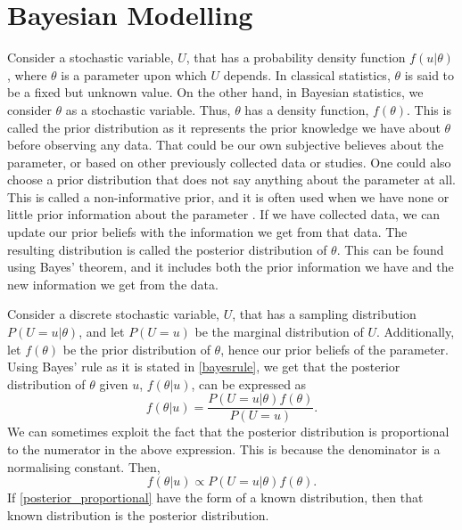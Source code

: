 \section{Bayesian Modelling}
\label{theory_bayesian_modelling}
Consider a stochastic variable, $U$, that has a probability density function $f(u|\theta)$, where $\theta$ is a parameter upon which $U$ depends. In classical statistics, $\theta$ is said to be a fixed but unknown value. On the other hand, in Bayesian statistics, we consider $\theta$ as a stochastic variable. Thus, $\theta$ has a density function, $f(\theta)$. This is called the prior distribution as it represents the prior knowledge we have about $\theta$ before observing any data. That could be our own subjective believes about the parameter, or based on other previously collected data or studies. One could also choose a prior distribution that does not say anything about the parameter at all. This is called a non-informative prior, and it is often used when we have none or little prior information about the parameter \citep{givens2012computational}. 
If we have collected data, we can update our prior beliefs with the information we get from that data. The resulting distribution is called the posterior distribution of $\theta$. This can be found using Bayes' theorem, and it includes both the prior information we have and the new information we get from the data. 

Consider a discrete stochastic variable, $U$, that has a sampling distribution $P(U=u|\theta)$, and let $P(U=u)$ be the marginal distribution of $U$. Additionally, let $f(\theta)$ be the prior distribution of $\theta$, hence our prior beliefs of the parameter. Using Bayes' rule as it is stated in \eqref{bayesrule}, we get that the posterior distribution of $\theta$ given $u$, $f(\theta|u)$, can be expressed as \citep{statinf}
\begin{equation*}
    f(\theta|u) = \frac{P(U=u|\theta)f(\theta)}{P(U=u)}.
\end{equation*}
We can sometimes exploit the fact that the posterior distribution is proportional to the numerator in the above expression. This is because the denominator is a normalising constant. Then,
\begin{equation}
    \label{posterior_proportional}
    f(\theta|u) \propto P(U=u|\theta)f(\theta).
\end{equation}
If \eqref{posterior_proportional} have the form of a known distribution, then that known distribution is the posterior distribution. 

